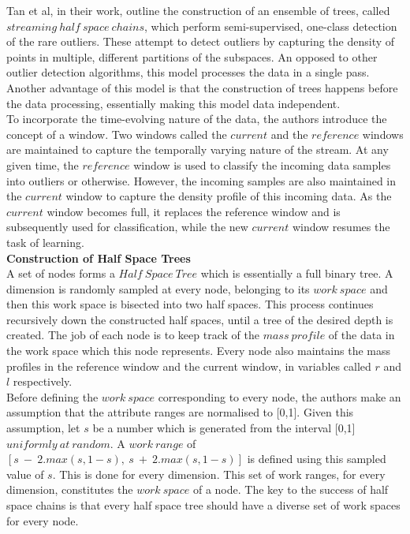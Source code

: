 Tan et al, in their work\cite{tan2011fast}, outline the construction of an ensemble of trees, called $streaming\ half\ space\ chains$, which perform semi-supervised, one-class detection of the rare outliers. These attempt to detect outliers by capturing the density of points in multiple, different partitions of the subspaces. An opposed to other outlier detection algorithms, this model processes the data in a single pass. Another  advantage of this model is that the construction of trees happens before the data processing, essentially making this model data independent. \\

To incorporate the time-evolving nature of the data, the authors introduce the concept of a window. Two windows called the $current$ and the $reference$ windows are maintained to capture the temporally varying nature of the stream. At any given time, the $reference$ window is used to classify the incoming data samples into outliers or otherwise. However, the incoming samples are also maintained in the $current$ window to capture the density profile of this incoming data. As the $current$ window becomes full, it replaces the reference window and is subsequently used for classification, while the new $current$ window resumes the task of learning. \\

\noindent \textbf{Construction of Half Space Trees} \\

A set of nodes forms a $Half\ Space\ Tree$ which is essentially a full binary tree. A dimension is randomly sampled at every node, belonging to its $work\ space$ and then this work space is bisected into two half spaces. This process continues recursively down the constructed half spaces, until a tree of the desired depth is created. The job of each node is to keep track of the $mass\ profile$ of the data in the work space which this node represents. Every node also maintains the mass profiles in the reference window and the current window, in variables called $r$ and $l$ respectively. \\

Before defining the $work\ space$ corresponding to every node, the authors make an assumption that the attribute ranges are normalised to [0,1]. Given this assumption, let $s$ be a number which is generated from the interval [0,1] $uniformly\ at\ random$. A $work\ range$ of $[s\ -\ 2.max(s,1-s),\ s\ +\ 2.max(s,1-s)]$ is defined using this sampled value of $s$. This is done for every dimension. This set of work ranges, for every dimension, constitutes the $work\ space$ of a node. The key to the success of half space chains is that every half space tree should have a diverse set of work spaces for every node. \\

